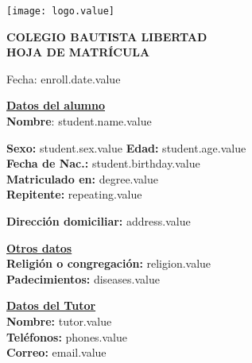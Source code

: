 \documentclass[12pt]{article}
\newcommand{\aField}[1]{#1}
\newcommand{\studentName}{student.name.value}
\newcommand{\studentBirthday}{student.birthday.value}
\newcommand{\studentAge}{student.age.value}
\newcommand{\studentSex}{student.sex.value}
\newcommand{\isRepeating}{repeating.value}
\newcommand{\degree}{degree.value}
\newcommand{\address}{address.value}
\newcommand{\religion}{religion.value}
\newcommand{\diseases}{diseases.value}
\newcommand{\tutor}{tutor.value}
\newcommand{\phones}{phones.value}
\newcommand{\email}{email.value}
\newcommand{\enrollDate}{enroll.date.value}
\begin{document}
    \begin{minipage}[c][2.5cm]{0.2\textwidth}
        \texttt{[image: logo.value]}
    \end{minipage}
    \begin{minipage}[c][2.5cm]{0.6\textwidth}
        \begin{center}
            \textbf{\large COLEGIO BAUTISTA LIBERTAD\\HOJA DE MATRÍCULA}
        \end{center}
    \end{minipage}
    
    \hfill Fecha: \enrollDate
    
    \textbf{\uline{Datos del alumno}}\\
    \textbf{Nombre}: \aField{\studentName}
    \par\vspace{1mm}
    \begin{minipage}[t]{0.48\textwidth}
        \textbf{Sexo:} \aField{\studentSex}\hspace{7mm} \textbf{Edad:} \aField{\studentAge}\\
        \textbf{Fecha de Nac.:} \aField{\studentBirthday}\\
        \textbf{Matriculado en:} \aField{\degree}\\
        \textbf{Repitente:} \aField{\isRepeating}
    \end{minipage}
    \hfill
    \begin{minipage}[t]{0.48\textwidth}
        \textbf{Dirección domiciliar:} \aField{\address}
    \end{minipage}
    \par\vspace{4mm}
    \begin{minipage}[t]{0.48\textwidth}
        \textbf{\uline{Otros datos}}\\
        \textbf{Religión o congregación:} \aField{\religion}\\
        \textbf{Padecimientos:} \aField{\diseases}
    \end{minipage}
    \hfill
    \begin{minipage}[t]{0.48\textwidth}
        \textbf{\uline{Datos del Tutor}}\\
        \textbf{Nombre:} \aField{\tutor}\\
        \textbf{Teléfonos:} \aField{\phones}\\
        \textbf{Correo:} \aField{\email}
    \end{minipage}
\end{document}
